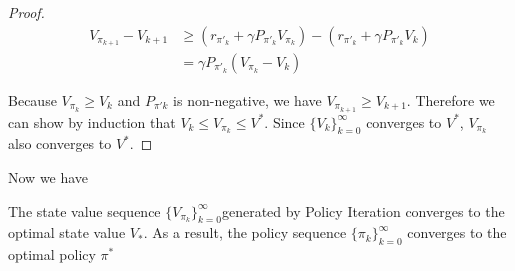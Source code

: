 \begin{proof}
    \begin{align*}
        V_{\pi_{k+1}}-V_{k+1} &\ge (r_{\pi'_{k}}+\gamma P_{\pi'_{k}}V_{\pi_{k}})-(r_{\pi'_{k}}+\gamma P_{\pi'_{k}}V_k) \\
                              &= \gamma P_{\pi'_{k}}(V_{\pi_{k}}-V_{k})
    \end{align*}

    Because $V_{\pi_{k}}\ge V_{k}$ and $P_{\pi'{k}}$ is non-negative, we have $V_{\pi_{k+1}}\ge V_{k+1}$. Therefore we can show by induction that $V_{k}\le V_{\pi_{k}}\le V^*$. Since $\{V_{k}\}_{k=0}^{\infty}$ converges to $V^*$, $V_{\pi_{k}}$ also converges to $V^*$.
\end{proof}

Now we have
\begin{theorem}
    The state value sequence $\{V_{\pi_{k}}\}_{k=0}^{\infty}$generated by Policy Iteration converges to the optimal state value $V_{*}$. As a result, the policy sequence $\{\pi_{k}\}_{k=0}^{\infty}$ converges to the optimal policy $\pi^{*}$
\end{theorem}


